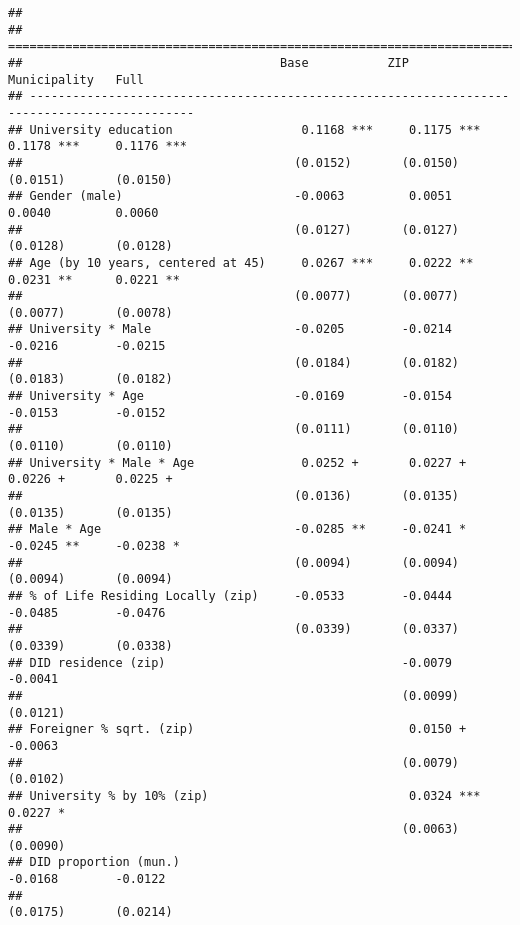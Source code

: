 \documentclass[
]{article}
\begin{document}
\begin{verbatim}
## 
## =============================================================================================
##                                    Base           ZIP            Municipality   Full         
## ---------------------------------------------------------------------------------------------
## University education                  0.1168 ***     0.1175 ***     0.1178 ***     0.1176 ***
##                                      (0.0152)       (0.0150)       (0.0151)       (0.0150)   
## Gender (male)                        -0.0063         0.0051         0.0040         0.0060    
##                                      (0.0127)       (0.0127)       (0.0128)       (0.0128)   
## Age (by 10 years, centered at 45)     0.0267 ***     0.0222 **      0.0231 **      0.0221 ** 
##                                      (0.0077)       (0.0077)       (0.0077)       (0.0078)   
## University * Male                    -0.0205        -0.0214        -0.0216        -0.0215    
##                                      (0.0184)       (0.0182)       (0.0183)       (0.0182)   
## University * Age                     -0.0169        -0.0154        -0.0153        -0.0152    
##                                      (0.0111)       (0.0110)       (0.0110)       (0.0110)   
## University * Male * Age               0.0252 +       0.0227 +       0.0226 +       0.0225 +  
##                                      (0.0136)       (0.0135)       (0.0135)       (0.0135)   
## Male * Age                           -0.0285 **     -0.0241 *      -0.0245 **     -0.0238 *  
##                                      (0.0094)       (0.0094)       (0.0094)       (0.0094)   
## % of Life Residing Locally (zip)     -0.0533        -0.0444        -0.0485        -0.0476    
##                                      (0.0339)       (0.0337)       (0.0339)       (0.0338)   
## DID residence (zip)                                 -0.0079                       -0.0041    
##                                                     (0.0099)                      (0.0121)   
## Foreigner % sqrt. (zip)                              0.0150 +                     -0.0063    
##                                                     (0.0079)                      (0.0102)   
## University % by 10% (zip)                            0.0324 ***                    0.0227 *  
##                                                     (0.0063)                      (0.0090)   
## DID proportion (mun.)                                              -0.0168        -0.0122    
##                                                                    (0.0175)       (0.0214)   

\end{verbatim}
\end{document}
